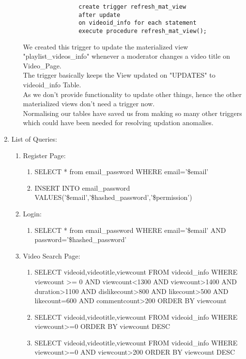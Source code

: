 \documentclass[10pt]{article}
\begin{document}
\begin{enumerate}
\begin{enumerate}
\begin{lstlisting}
				create trigger refresh_mat_view
				after update
				on videoid_info for each statement 
				execute procedure refresh_mat_view();
				\end{lstlisting}\par
				We created this trigger to update the materialized view "playlist\_videos\_info" whenever a moderator changes a video title on Video\_Page.\\
				The trigger basically keeps the View updated on "UPDATES" to videoid\_info Table.\\
				As we don't provide functionality to update other things, hence the other materialized views don't need a trigger now.\\
				Normalising our tables have saved us from making so many other triggers which could have been needed for resolving updation anomalies.
		\end{enumerate}
		\item List of Queries:\\
		\begin{enumerate}
			\item Register Page:
			\begin{enumerate}
				\item SELECT * from email\_password WHERE email='\$email'
				\item INSERT INTO email\_password VALUES('\$email','\$hashed\_password','\$permission')
			\end{enumerate}
			\item Login:
			\begin{enumerate}
				\item SELECT * from email\_password WHERE email='\$email' AND password='\$hashed\_password'
			\end{enumerate}
			\item Video Search Page:
			\begin{enumerate}
				\item SELECT videoid,videotitle,viewcount FROM videoid\_info WHERE viewcount \textgreater= 0 AND viewcount\textless1300 AND viewcount\textgreater1400 AND duration\textgreater1100 AND  dislikecount\textgreater800 AND likecount\textgreater500 AND likecount=600 AND commentcount\textgreater200 ORDER BY viewcount
				\item SELECT videoid,videotitle,viewcount FROM videoid\_info WHERE viewcount\textgreater=0 ORDER BY viewcount DESC
				\item SELECT videoid,videotitle,viewcount FROM videoid\_info WHERE viewcount\textgreater=0 AND viewcount\textgreater200 ORDER BY viewcount DESC

\end{enumerate}
\end{enumerate}
\end{enumerate}
\end{document}
